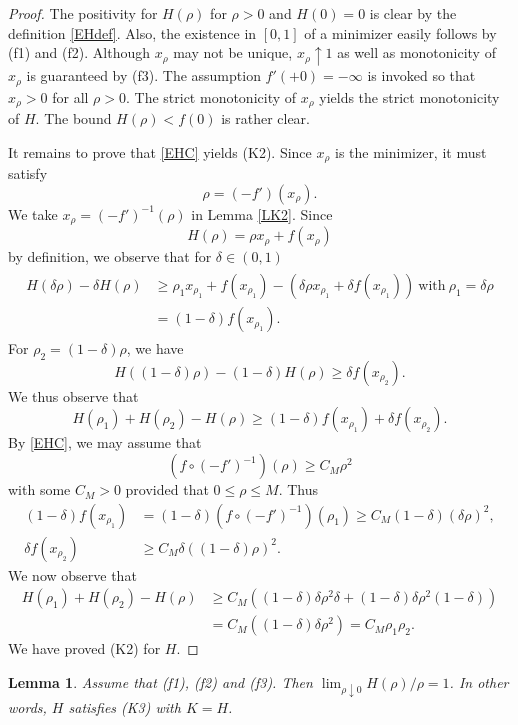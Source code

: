\documentclass[11pt]{amsart} %
\numberwithin{equation}{section}
\newtheorem{lem}[thm]{Lemma}
\begin{document}
\begin{proof}
The positivity for $H(\rho)$ for $\rho>0$ and $H(0)=0$ is clear by the definition \eqref{EHdef}.
 Also, the existence in $[0,1]$ of a minimizer easily follows by (f1) and (f2).
 Although $x_\rho$ may not be unique, $x_\rho\uparrow1$ as well as monotonicity of $x_\rho$ is guaranteed by (f3). 
 The assumption $f'(+0)=-\infty$ is invoked so that $x_\rho>0$ for all $\rho>0$. The strict monotonicity of $x_\rho$ yields the strict monotonicity of $H$.
 The bound $H(\rho)<f(0)$ is rather clear.

It remains to prove that \eqref{EHC} yields (K2).
 Since $x_\rho$ is the minimizer, it must satisfy
\[
	\rho = (-f') (x_\rho).
\]
We take $x_\rho=(-f')^{-1}(\rho)$ in Lemma \ref{LK2}.
 Since
\[
	H(\rho) = \rho x_\rho + f(x_\rho)
\]
by definition, we observe that for $\delta\in(0,1)$
\begin{align}
\begin{aligned} \label{EEH} %
	H(\delta\rho) - \delta H(\rho) &\geq \rho_1 x_{\rho_1} + f(x_{\rho_1})
	- \left( \delta\rho x_{\rho_1} + \delta f(x_{\rho_1}) \right)\ \text{with}\ \rho_1=\delta\rho \\
	&= (1-\delta) f(x_{\rho_1}). 
\end{aligned}
\end{align}
For $\rho_2=(1-\delta)\rho$, we have
\[
	H \left( (1-\delta)\rho \right) - (1-\delta) H (\rho) \geq \delta f(x_{\rho_2}).
\]
We thus observe that
\[
	H(\rho_1) + H(\rho_2) - H(\rho)
	\geq (1-\delta) f(x_{\rho_1}) + \delta f(x_{\rho_2}).
\]
By \eqref{EHC}, we may assume that
\[
	\left( f \circ (-f')^{-1} \right) (\rho) \geq C_M \rho^2
\]
with some $C_M>0$ provided that $0\leq\rho\leq M$.
Thus
\begin{align*}
	(1-\delta) f(x_{\rho_1}) &= (1-\delta) \left( f \circ (-f')^{-1} \right) (\rho_1) \geq C_M(1-\delta)(\delta\rho)^2, \\
	\delta f(x_{\rho_2}) &\geq C_M \delta \left( (1-\delta) \rho \right)^2.  
\end{align*}
We now observe that
\begin{align*}
	H(\rho_1) + H(\rho_2) - H(\rho) &\geq C_M \left( (1-\delta)\delta\rho^2 \delta + (1-\delta)\delta\rho^2(1-\delta) \right) \\
	&= C_M \left( (1-\delta) \delta\rho^2 \right) 
	= C_M \rho_1 \rho_2.  
\end{align*}
We have proved (K2) for $H$.
\end{proof}
\begin{lem} \label{LK3}
Assume that (f1), (f2) and (f3).
 Then $\lim_{\rho\downarrow0}H(\rho)/\rho=1$.
 In other words, $H$ satisfies (K3) with $K=H$.
\end{lem}
\end{document}
